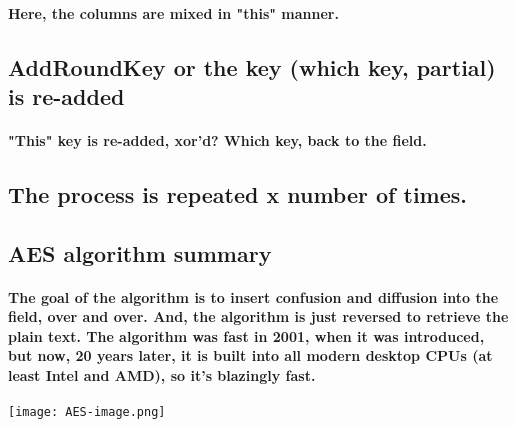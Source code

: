 \paragraph{Here, the columns are mixed in "this" manner.}

\subsection{AddRoundKey or the key (which key, partial) is re-added}
\paragraph{"This" key is re-added, xor'd? Which key, back to the field.}


\subsection{The process is repeated x number of times.}


\subsection{AES algorithm summary}
\paragraph{The goal of the algorithm is to insert confusion and diffusion into the field, over and over. And, the algorithm is just reversed to retrieve the plain text. The algorithm was fast in 2001, when it was introduced, but now, 20 years later, it is built into all modern desktop CPUs (at least Intel and AMD), so it's blazingly fast.}

\begin{center}
\texttt{[image: AES-image.png]}
\end{center}